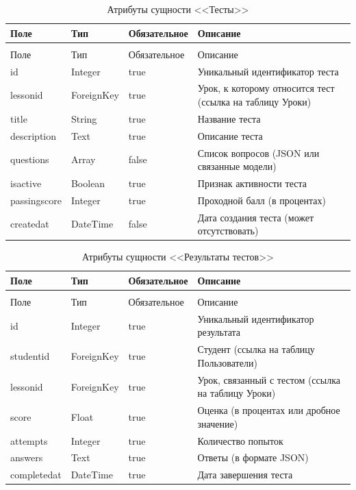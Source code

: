 \begin{xltabular}{\textwidth}{|l|l|p{3.2cm}|X|}
	\caption{Атрибуты сущности <<Тесты>>\label{tests:table}}\\ \hline
	Поле & Тип & Обязательное & Описание \\ \hline
	\endfirsthead
	\\ \hline
	Поле & Тип & Обязательное & Описание \\ \hline
	\endhead
	id & Integer & true & Уникальный идентификатор теста \\ \hline
	lessonid & ForeignKey & true & Урок, к которому относится тест (ссылка на таблицу Уроки) \\ \hline
	title & String & true & Название теста \\ \hline
	description & Text & true & Описание теста \\ \hline
	questions & Array & false & Список вопросов (JSON или связанные модели) \\ \hline
	isactive & Boolean & true & Признак активности теста \\ \hline
	passingscore & Integer & true & Проходной балл (в процентах) \\ \hline
	createdat & DateTime & false & Дата создания теста (может отсутствовать) \\ \hline
\end{xltabular}

\begin{xltabular}{\textwidth}{|l|l|p{3.2cm}|X|}
	\caption{Атрибуты сущности <<Результаты тестов>>\label{test_results:table}}\\ \hline
	Поле & Тип & Обязательное & Описание \\ \hline
	\endfirsthead
	\\ \hline
	Поле & Тип & Обязательное & Описание \\ \hline
	\endhead
	id & Integer & true & Уникальный идентификатор результата \\ \hline
	studentid & ForeignKey & true & Студент (ссылка на таблицу Пользователи) \\ \hline
	lessonid & ForeignKey & true & Урок, связанный с тестом (ссылка на таблицу Уроки) \\ \hline
	score & Float & true & Оценка (в процентах или дробное значение) \\ \hline
	attempts & Integer & true & Количество попыток \\ \hline
	answers & Text & true & Ответы (в формате JSON) \\ \hline
	completedat & DateTime & true & Дата завершения теста \\ \hline
\end{xltabular}


